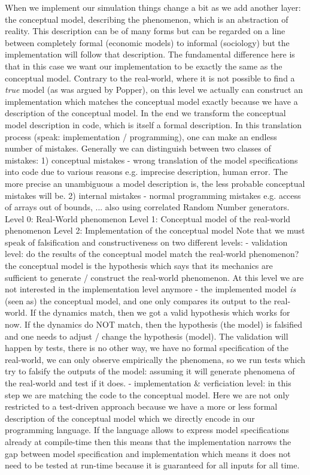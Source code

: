When we implement our simulation things change a bit as we add another layer: the conceptual model, describing the phenomenon, which is an abstraction of reality. This description can be of many forms but can be regarded on a line between completely formal (economic models) to informal (sociology) but the implementation will follow that description. The fundamental difference here is that in this case we want our implementation to be exactly the same as the conceptual model. Contrary to the real-world, where it is not possible to find a \textit{true} model (as was argued by Popper), on this level we actually can construct an implementation which matches the conceptual model exactly because we have a description of the conceptual model. In the end we transform the conceptual model description in code, which is itself a formal description. In this translation process (speak: implementation / programming), one can make an endless number of mistakes. Generally we can distinguish between two classes of mistakes: 
1) conceptual mistakes - wrong translation of the model specifications into code due to various reasons e.g. imprecise description, human error. The more precise an unambiguous a model description is, the less probable conceptual mistakes will be.
2) internal mistakes - normal programming mistakes e.g. access of arrays out of bounds, ... also using correlated Random Number generators.
%
Level 0: Real-World phenomenon
Level 1: Conceptual model of the real-world phenomenon
Level 2: Implementation of the conceptual model
%
Note that we must speak of falsification and constructiveness on two different levels:
- validation level: do the results of the conceptual model match the real-world phenomenon? the conceptual model is the hypothesis which says that its mechanics are sufficient to generate / construct the real-world phenomenon. At this level we are not interested in the implementation level anymore - the implemented model \textit{is} (seen as) the conceptual model, and one only compares its output to the real-world. If the dynamics match, then we got a valid hypothesis which works for now. If the dynamics do NOT match, then the hypothesis (the model) is falsified and one needs to adjust / change the hypothesis (model). The validation will happen by tests, there is no other way, we have no formal specification of the real-world, we can only observe empirically the phenomena, so we run tests which try to falsify the outputs of the model: assuming it will generate phenomena of the real-world and test if it does.
- implementation \& verficiation level: in this step we are matching the code to the conceptual model. Here we are not only restricted to a test-driven approach because we have a more or less formal description of the conceptual model which we directly encode in our programming language. If the language allows to express model specifications already at compile-time then this means that the implementation narrows the gap between model specification and implementation which means it does not need to be tested at run-time because it is guaranteed for all inputs for all time. 

